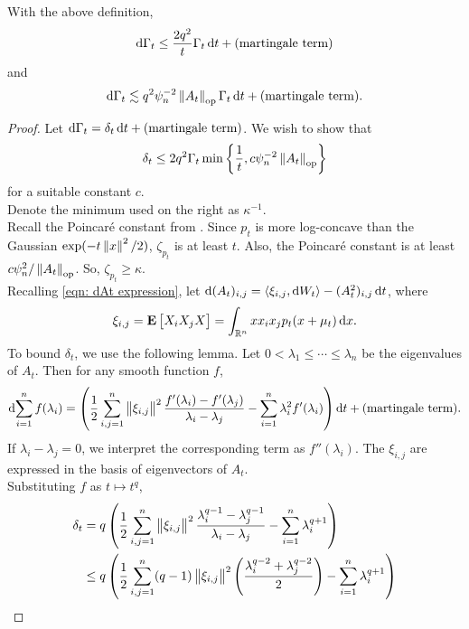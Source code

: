\documentclass{article}
\begin{document}
		\begin{flem}
			\label{primary bounds chen}
			With the above definition,
			\begin{equation}
				\label{kls chen bound A}
				\operatorname{d}\!{\Gamma_t} \leq \frac{2q^2}{t}\Gamma_t\operatorname{d}\!{t} + (\text{martingale term})
			\end{equation}
			and
			\begin{equation}
				\label{kls chen bound B}
				\operatorname{d}\!{\Gamma_t} \lesssim q^2\psi_n^{-2}\left\lVert A_t\right\rVert_{\text{op}}\Gamma_t\operatorname{d}\!{t} + (\text{martingale term}).
			\end{equation}
		\end{flem}
		\begin{proof}
			Let $\operatorname{d}\!{\Gamma_t} = \delta_t \operatorname{d}\!{t} + \text{(martingale term)}$. We wish to show that
			\[ \delta_t \leq 2q^2\Gamma_t \min\left\{ \frac{1}{t} , c\psi_n^{-2}\left\lVert A_t\right\rVert_{\text{op}} \right\} \]
			for a suitable constant $c$.\\
			Denote the minimum used on the right as $\kappa^{-1}$.\\
			Recall the Poincar\'{e} constant from .
			Since $p_t$ is more log-concave than the Gaussian $\exp(-t\left\lVert x\right\rVert^2/2)$, $\zeta_{p_t}$ is at least $t$.
			Also, the Poincar\'{e} constant is at least $c\psi_n^2 / \left\lVert A_t\right\rVert_{\text{op}}$. So, $\zeta_{p_t} \geq \kappa$.\\
			Recalling \eqref{eqn: dAt expression}, let $\operatorname{d}\!{(A_t)_{i,j}} = \langle\xi_{i,j},\operatorname{d}\!{W}_t\rangle - (A_t^2)_{i,j} \operatorname{d}\!{t}$, where
			\[ \xi_{i,j} = \textbf{E}\left[ X_i X_j X \right] = \int_{\mathbb{R}^n} x x_i x_j p_t(x+\mu_t) \operatorname{d}\!{x}. \]
			To bound $\delta_t$, we use the following lemma. Let $0 < \lambda_1 \leq \cdots \leq \lambda_n$ be the eigenvalues of $A_t$. Then for any smooth function $f$,
			\[ \operatorname{d}\!{ \sum_{i=1}^n f(\lambda_i) } = \left( \frac{1}{2} \sum_{i,j = 1}^n \left\lVert\xi_{i,j}\right\rVert^2 \frac{f'(\lambda_i) - f'(\lambda_j)}{\lambda_i - \lambda_j} - \sum_{i=1}^n \lambda_i^2 f'(\lambda_i) \right) \operatorname{d}\!{t} + \text{(martingale term)}. \]
			If $\lambda_i - \lambda_j = 0$, we interpret the corresponding term as $f''(\lambda_i)$. The $\xi_{i,j}$ are expressed in the basis of eigenvectors of $A_t$.\\
			Substituting $f$ as $t \mapsto t^q$,
			\begin{align*}
				\delta_t &= q \left( \frac{1}{2} \sum_{i,j = 1}^n \norm{\xi_{i,j}}^2 \frac{\lambda_i^{q-1} - \lambda_j^{q-1}}{\lambda_i - \lambda_j} - \sum_{i=1}^n \lambda_i^{q+1} \right) \\
					&\leq q \left( \frac{1}{2} \sum_{i,j = 1}^n (q-1) \norm{\xi_{i,j}}^2 \left(\frac{\lambda_i^{q-2} + \lambda_j^{q-2}}{2}\right) - \sum_{i=1}^n \lambda_i^{q+1} \right) \\

\end{align*}
\end{proof}
\end{document}
